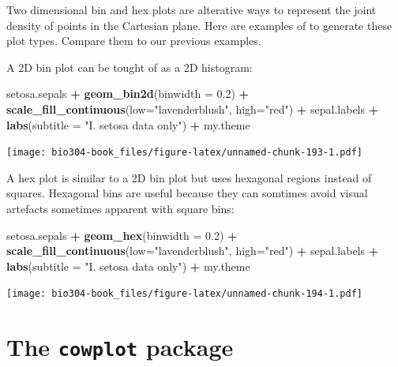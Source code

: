 \documentclass[]{book}
\newenvironment{Shaded}{\begin{snugshade}}{\end{snugshade}}
\newcommand{\DataTypeTok}[1]{\textcolor[rgb]{0.13,0.29,0.53}{#1}}
\newcommand{\FloatTok}[1]{\textcolor[rgb]{0.00,0.00,0.81}{#1}}
\newcommand{\KeywordTok}[1]{\textcolor[rgb]{0.13,0.29,0.53}{\textbf{#1}}}
\newcommand{\NormalTok}[1]{#1}
\newcommand{\OperatorTok}[1]{\textcolor[rgb]{0.81,0.36,0.00}{\textbf{#1}}}
\newcommand{\StringTok}[1]{\textcolor[rgb]{0.31,0.60,0.02}{#1}}
\theoremstyle{definition}
\theoremstyle{definition}
\theoremstyle{definition}
\theoremstyle{remark}
\begin{document}
Two dimensional bin and hex plots are alterative ways to represent the
joint density of points in the Cartesian plane. Here are examples of to
generate these plot types. Compare them to our previous examples.

A 2D bin plot can be tought of as a 2D histogram:

\begin{Shaded}
\begin{Highlighting}[]
\NormalTok{setosa.sepals }\OperatorTok{+}\StringTok{ }
\StringTok{  }\KeywordTok{geom_bin2d}\NormalTok{(}\DataTypeTok{binwidth =} \FloatTok{0.2}\NormalTok{) }\OperatorTok{+}\StringTok{ }
\StringTok{  }\KeywordTok{scale_fill_continuous}\NormalTok{(}\DataTypeTok{low=}\StringTok{"lavenderblush"}\NormalTok{, }\DataTypeTok{high=}\StringTok{"red"}\NormalTok{) }\OperatorTok{+}
\StringTok{  }\NormalTok{sepal.labels }\OperatorTok{+}\StringTok{ }\KeywordTok{labs}\NormalTok{(}\DataTypeTok{subtitle =} \StringTok{"I. setosa data only"}\NormalTok{) }\OperatorTok{+}
\StringTok{  }\NormalTok{my.theme}
\end{Highlighting}
\end{Shaded}

\texttt{[image: bio304-book\_files/figure-latex/unnamed-chunk-193-1.pdf]}

A hex plot is similar to a 2D bin plot but uses hexagonal regions
instead of squares. Hexagonal bins are useful because they can somtimes
avoid visual artefacts sometimes apparent with square bins:

\begin{Shaded}
\begin{Highlighting}[]
\NormalTok{setosa.sepals }\OperatorTok{+}\StringTok{ }
\StringTok{  }\KeywordTok{geom_hex}\NormalTok{(}\DataTypeTok{binwidth =} \FloatTok{0.2}\NormalTok{) }\OperatorTok{+}\StringTok{ }
\StringTok{  }\KeywordTok{scale_fill_continuous}\NormalTok{(}\DataTypeTok{low=}\StringTok{"lavenderblush"}\NormalTok{, }\DataTypeTok{high=}\StringTok{"red"}\NormalTok{) }\OperatorTok{+}
\StringTok{  }\NormalTok{sepal.labels }\OperatorTok{+}\StringTok{ }\KeywordTok{labs}\NormalTok{(}\DataTypeTok{subtitle =} \StringTok{"I. setosa data only"}\NormalTok{) }\OperatorTok{+}
\StringTok{  }\NormalTok{my.theme}
\end{Highlighting}
\end{Shaded}

\texttt{[image: bio304-book\_files/figure-latex/unnamed-chunk-194-1.pdf]}

\hypertarget{the-cowplot-package}{%
\section{\texorpdfstring{The \texttt{cowplot}
package}{The cowplot package}}\label{the-cowplot-package}}
\end{document}
